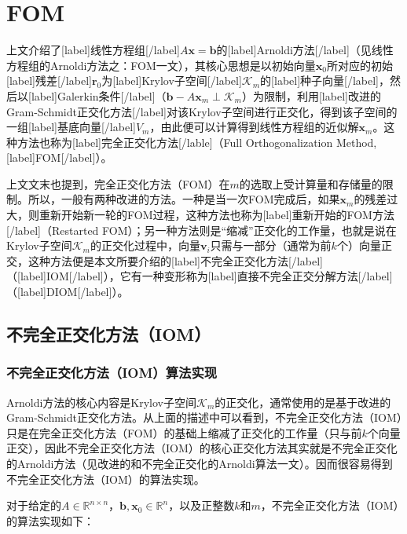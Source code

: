 \documentclass[UTF8,nofonts]{ctexart}
\begin{document}

\section*{FOM}


上文介绍了[label]线性方程组[/label]$A\boldsymbol{x}=\boldsymbol{b}$的[label]Arnoldi方法[/label]（见线性方程组的Arnoldi方法之：FOM一文），其核心思想是以初始向量$\boldsymbol{x}_0$所对应的初始[label]残差[/label]$\boldsymbol{r}_0$为[label]Krylov子空间[/label]$\mathcal{K}_m$的[label]种子向量[/label]，然后以[label]Galerkin条件[/label]（$\boldsymbol{b}-A\boldsymbol{x}_m\perp\mathcal{K}_m$）为限制，利用[label]改进的Gram-Schmidt正交化方法[/label]对该Krylov子空间进行正交化，得到该子空间的一组[label]基底向量[/label]$V_m$，由此便可以计算得到线性方程组的近似解$\boldsymbol{x}_m$。这种方法也称为[label]完全正交化方法[/lable]（Full Orthogonalization Method, [label]FOM[/label]）。

上文文末也提到，完全正交化方法（FOM）在$m$的选取上受计算量和存储量的限制。所以，一般有两种改进的方法。一种是当一次FOM完成后，如果$\boldsymbol{x}_m$的残差过大，则重新开始新一轮的FOM过程，这种方法也称为[label]重新开始的FOM方法[/label]（Restarted FOM）；另一种方法则是“缩减”正交化的工作量，也就是说在Krylov子空间$\mathcal{K}_m$的正交化过程中，向量$\boldsymbol{v}_i$只需与一部分（通常为前$k$个）向量正交，这种方法便是本文所要介绍的[label]不完全正交化方法[/label]（[label]IOM[/label]），它有一种变形称为[label]直接不完全正交分解方法[/label]（[label]DIOM[/label]）。

\subsection*{不完全正交化方法（IOM）}

\subsubsection*{不完全正交化方法（IOM）算法实现}

Arnoldi方法的核心内容是Krylov子空间$\mathcal{K}_m$的正交化，通常使用的是基于改进的Gram-Schmidt正交化方法。从上面的描述中可以看到，不完全正交化方法（IOM）只是在完全正交化方法（FOM）的基础上缩减了正交化的工作量（只与前$k$个向量正交），因此不完全正交化方法（IOM）的核心正交化方法其实就是不完全正交化的Arnoldi方法（见改进的和不完全正交化的Arnoldi算法一文）。因而很容易得到不完全正交化方法（IOM）的算法实现。

对于给定的$A\in\mathbb{R}^{n \times n}$，$\boldsymbol{b},\boldsymbol{x}_0\in\mathbb{R}^n$，以及正整数$k$和$m$，不完全正交化方法（IOM）的算法实现如下：
\end{document}
